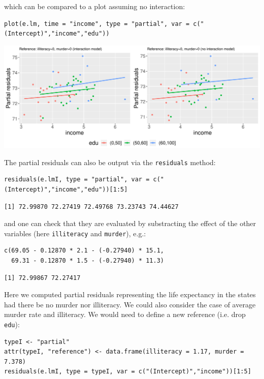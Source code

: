 \documentclass[12pt]{article}
\begin{document}
which can be compared to a plot assuming no interaction:
\lstset{language=r,label= ,caption= ,captionpos=b,numbers=none}
\begin{lstlisting}
plot(e.lm, time = "income", type = "partial", var = c("(Intercept)","income","edu"))
\end{lstlisting}

\begin{center}
\includegraphics[trim={0 0 0 0},width=1\textwidth]{./figures/gg-lmpres-interaction.pdf}
\end{center}


The partial residuals can also be output via the \texttt{residuals} method:
\lstset{language=r,label= ,caption= ,captionpos=b,numbers=none}
\begin{lstlisting}
residuals(e.lmI, type = "partial", var = c("(Intercept)","income","edu"))[1:5]
\end{lstlisting}

\begin{verbatim}
[1] 72.99870 72.27419 72.49768 73.23743 74.44627
\end{verbatim}


and one can check that they are evaluated by substracting the effect
of the other variables (here \texttt{illiteracy} and \texttt{murder}), e.g.:
\lstset{language=r,label= ,caption= ,captionpos=b,numbers=none}
\begin{lstlisting}
c(69.05 - 0.12870 * 2.1 - (-0.27940) * 15.1,
  69.31 - 0.12870 * 1.5 - (-0.27940) * 11.3)
\end{lstlisting}

\begin{verbatim}
[1] 72.99867 72.27417
\end{verbatim}


Here we computed partial residuals representing the life expectancy in
the states had there be no murder nor illiteracy. We could also
consider the case of average murder rate and illiteracy. We would need
to define a new reference (i.e. drop \texttt{edu}):
\lstset{language=r,label= ,caption= ,captionpos=b,numbers=none}
\begin{lstlisting}
typeI <- "partial"
attr(typeI, "reference") <- data.frame(illiteracy = 1.17, murder = 7.378)
residuals(e.lmI, type = typeI, var = c("(Intercept)","income"))[1:5]
\end{lstlisting}
\end{document}
